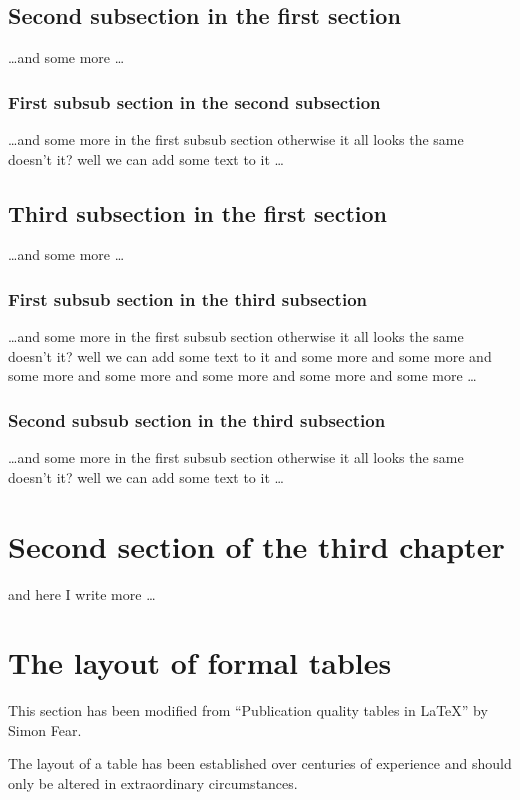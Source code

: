 \documentclass[a4paper,12pt,times,print,index, custombib]{PhDThesisPSnPDF}\usepackage[]{graphicx}\usepackage[]{color}
\begin{document}
\subsection{Second subsection in the first section}
\dots and some more \dots

\subsubsection{First subsub section in the second subsection}
\dots and some more in the first subsub section otherwise it all looks the same
doesn't it? well we can add some text to it \dots

\subsection{Third subsection in the first section}
\dots and some more \dots

\subsubsection{First subsub section in the third subsection}
\dots and some more in the first subsub section otherwise it all looks the same
doesn't it? well we can add some text to it and some more and some more and
some more and some more and some more and some more and some more \dots

\subsubsection{Second subsub section in the third subsection}
\dots and some more in the first subsub section otherwise it all looks the same
doesn't it? well we can add some text to it \dots

\section{Second section of the third chapter}
and here I write more \dots

\section{The layout of formal tables}
This section has been modified from ``Publication quality tables in \LaTeX*''
 by Simon Fear.

The layout of a table has been established over centuries of experience and 
should only be altered in extraordinary circumstances. 
\end{document}
